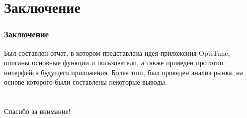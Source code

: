 \documentclass[10pt,utf8,presentation,notheorems,xcolor=dvipsnames,compress]{beamer}
\begin{document}
\section{Заключение}

\begin{frame}[fragile,t]
\frametitle{Заключение}
\begin{block}{}
Был составлен отчет, в котором представлена идея приложения OptiTune, описаны основные функции и пользователи, а также приведен прототип интерфейса будущего приложения. Более того, был проведен анализ рынка, на основе которого были составлены некоторые выводы.
\end{block}
\end{frame}

\section{}

\begin{frame}

\frametitle{}
\centering
\begin{huge}
Спасибо за внимание!
\end{huge}
\end{frame}
\end{document}
